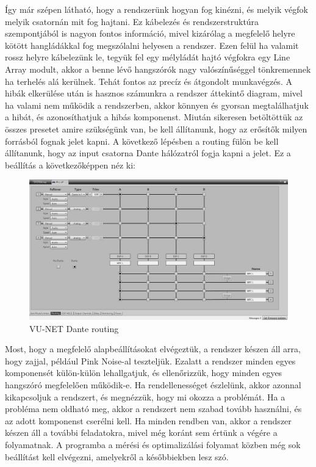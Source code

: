 Így már szépen látható, hogy a rendszerünk hogyan fog kinézni, és melyik végfok melyik csatornán mit fog hajtani.
Ez kábelezés és rendszerstruktúra szempontjából is nagyon fontos információ, mivel kizárólag a megfelelő helyre
kötött hangládákkal fog megszólalni helyesen a rendszer. Ezen felül ha valamit rossz helyre kábelezünk le, tegyük fel egy
mélyládát hajtó végfokra egy Line Array modult, akkor a benne lévő hangszórók nagy valószínűséggel tönkremennek ha terhelés alá kerülnek.
Tehát fontos az precíz és átgondolt munkavégzés. A hibák elkerülése után is hasznos számunkra a rendszer áttekintő diagram,
mivel ha valami nem működik a rendszerben, akkor könnyen és gyorsan megtalálhatjuk a hibát, és azonosíthatjuk a hibás komponenst.
Miután sikeresen betöltöttük az összes presetet amire szükségünk van, be kell állítanunk, hogy az erősítők milyen forrásból
fognak jelet kapni. A következő lépésben a routing fülön be kell állítanunk, hogy az input csatorna Dante hálózatról fogja kapni a jelet.
Ez a beállítás a következőképpen néz ki:
\begin{figure}[H]
	\centering
	\includegraphics[width=\textwidth, keepaspectratio]{figures/vunet_routing_dante.jpg}
	\caption{VU-NET Dante routing}\label{fig:vunet_routing_dante}
\end{figure}
Most, hogy a megfelelő alapbeállításokat elvégeztük, a rendszer készen áll arra, hogy zajjal, például
Pink Noise-al teszteljük. Ezalatt a rendszer minden egyes komponensét külön-külön lehallgatjuk, és ellenőrizzük,
hogy minden egyes hangszóró megfelelően működik-e. Ha rendellenességet észlelünk, akkor azonnal kikapcsoljuk a rendszert,
és megnézzük, hogy mi okozza a problémát. Ha a probléma nem oldható meg, akkor a rendszert nem szabad tovább használni,
és az adott komponenst cserélni kell. Ha minden rendben van, akkor a rendszer készen áll a további feladatokra, mivel
még koránt sem értünk a végére a folyamatnak. A programba a mérési és optimalizálási folyamat közben még sok beállítást kell
elvégezni, amelyekről a későbbiekben lesz szó.
